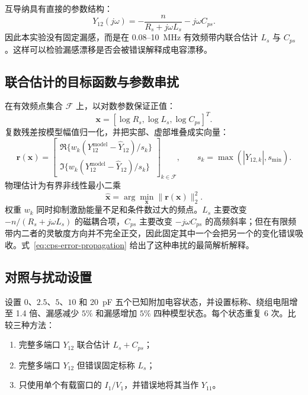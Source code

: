 \documentclass[UTF8,a4paper,12pt]{ctexart}
\begin{document}
互导纳具有直接的参数结构：
\begin{equation}
Y_{12}(j\omega)
=-
\frac{n}{R_s+j\omega L_s}
-j\omega C_{ps}.
\end{equation}
因此本实验没有固定漏感，而是在 $0.08$--\SI{10}{MHz} 有效频带内联合估计 $L_s$ 与 $C_{ps}$。这样可以检验漏感漂移是否会被错误解释成电容漂移。

\subsection{联合估计的目标函数与参数串扰}

在有效频点集合 $\mathcal F$ 上，以对数参数保证正值：
\begin{equation}
\mathbf x=[\log R_s,\log L_s,\log C_{ps}]^T.
\end{equation}
复数残差按模型幅值归一化，并把实部、虚部堆叠成实向量：
\begin{equation}
\mathbf r(\mathbf x)=
\begin{bmatrix}
\Re\{w_k(Y_{12}^{\mathrm{model}}-\hat Y_{12})/s_k\}\\
\Im\{w_k(Y_{12}^{\mathrm{model}}-\hat Y_{12})/s_k\}
\end{bmatrix}_{k\in\mathcal F},
\qquad
s_k=\max(|\hat Y_{12,k}|,s_{\min}).
\end{equation}
物理估计为有界非线性最小二乘
\begin{equation}
\hat{\mathbf x}=\arg\min_{\mathbf x}\|\mathbf r(\mathbf x)\|_2^2.
\label{eq:physical-inverse}
\end{equation}
权重 $w_k$ 同时抑制激励能量不足和条件数过大的频点。$L_s$ 主要改变 $-n/(R_s+j\omega L_s)$ 的磁耦合项，$C_{ps}$ 主要改变 $-j\omega C_{ps}$ 的高频斜率；但在有限频带内二者的灵敏度方向并不完全正交，因此固定其中一个会把另一个的变化错误吸收。式~\eqref{eq:cps-error-propagation} 给出了这种串扰的最简解析解释。

\subsection{对照与扰动设置}

设置 $0$、$2.5$、$5$、$10$ 和 \SI{20}{pF} 五个已知附加电容状态，并设置标称、绕组电阻增至 1.4 倍、漏感减少 $5\%$ 和漏感增加 $5\%$ 四种模型状态。每个状态重复 6 次。比较三种方法：
\begin{enumerate}
  \item 完整多端口 $Y_{12}$ 联合估计 $L_s+C_{ps}$；
  \item 完整多端口 $Y_{12}$ 但错误固定标称 $L_s$；
  \item 只使用单个有载窗口的 $I_1/V_1$，并错误地将其当作 $Y_{11}$。
\end{enumerate}
\end{document}
